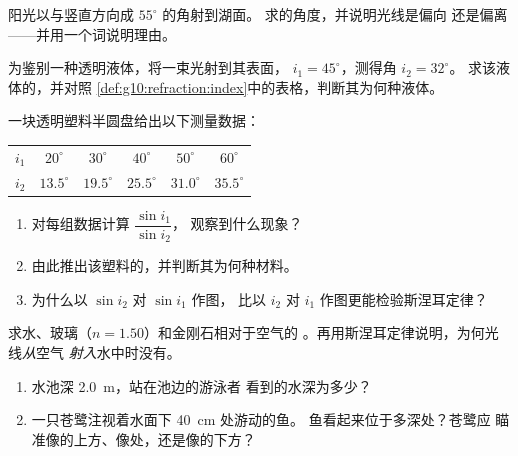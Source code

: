 \begin{exercise}[$\star$]\label{exo:g10:refraction:4}
阳光以与竖直方向成 $55^\circ$ 的角射到湖面。
求的角度，并说明光线是偏向
还是偏离——并用一个词说明理由。
\end{exercise}

\begin{exercise}[$\star$]\label{exo:g10:refraction:5}
为鉴别一种透明液体，将一束光射到其表面，
 $i_1 = 45^\circ$，测得角 $i_2 = 32^\circ$。
求该液体的，并对照
\cref{def:g10:refraction:index}中的表格，判断其为何种液体。
\end{exercise}

\begin{exercise}[$\star\star$]\label{exo:g10:refraction:6}
一块透明塑料半圆盘给出以下测量数据：
\begin{center}
\begin{tabular}{lccccc}
$i_1$ & $20^\circ$ & $30^\circ$ & $40^\circ$ & $50^\circ$ & $60^\circ$ \\
$i_2$ & $13.5^\circ$ & $19.5^\circ$ & $25.5^\circ$ & $31.0^\circ$
      & $35.5^\circ$ \\
\end{tabular}
\end{center}
\begin{enumerate}
  \item 对每组数据计算 $\dfrac{\sin i_1}{\sin i_2}$，
        观察到什么现象？
  \item 由此推出该塑料的，并判断其为何种材料。
  \item 为什么以 $\sin i_2$ 对 $\sin i_1$ 作图，
        比以 $i_2$ 对 $i_1$ 作图更能检验斯涅耳定律？
\end{enumerate}
\end{exercise}

\begin{exercise}[$\star\star$]\label{exo:g10:refraction:7}
求水、玻璃（$n = 1.50$）和金刚石相对于空气的
。再用斯涅耳定律说明，为何光线\emph{从}空气
\emph{射入}水中时没有。
\end{exercise}

\begin{exercise}[$\star\star$]\label{exo:g10:refraction:8}
\begin{enumerate}
  \item 水池深 \qty{2.0}{m}，站在池边的游泳者
        看到的水深为多少？
  \item 一只苍鹭注视着水面下 \qty{40}{cm} 处游动的鱼。
        鱼看起来位于多深处？苍鹭应
        瞄准像的上方、像处，还是像的下方？
\end{enumerate}
\end{exercise}

